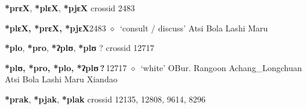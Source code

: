 \item
\textbf{*prɛX}, \textbf{*plɛX}, \textbf{*pjɛX}
  {\tiny crossid 2483}
  \begin{list}{}{\leftmargin=1.5em \itemindent=-1.5em}
  \item {\footnotesize \textbf{*plɛX, *prɛX, *pjɛX}}{\tiny 2483}
         $\diamond$~`consult / discuss'
         Atsi 
\hspace{1ex}
         Bola 
\hspace{1ex}
         Lashi 
\hspace{1ex}
         Maru 
  \end{list}
\item
\textbf{*plo}, \textbf{*pro}, \textbf{*ʔplʊ}, \textbf{*plʊ}
?
  {\tiny crossid 12717}
  \begin{list}{}{\leftmargin=1.5em \itemindent=-1.5em}
  \item {\footnotesize \textbf{*plʊ, *pro, *plo, *ʔplʊ\,?\,}}{\tiny 12717}
         $\diamond$~`white'
         OBur. 
\hspace{1ex}
         Rangoon 
\hspace{1ex}
         Achang\_Longchuan 
\hspace{1ex}
         Atsi 
\hspace{1ex}
         Bola 
\hspace{1ex}
         Lashi 
\hspace{1ex}
         Maru 
\hspace{1ex}
         Xiandao 
  \end{list}
\item
\textbf{*prak}, \textbf{*pjak}, \textbf{*plak}
  {\tiny crossid 12135, 12808, 9614, 8296}
